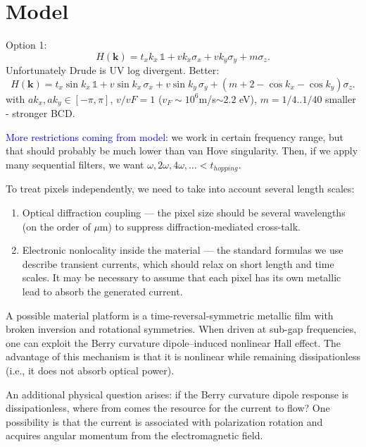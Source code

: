 \documentclass[aps, prb, superscriptaddress, longbibliography]{revtex4-2}
\newcommand{\addDO}[1]{\textcolor{blue}{#1}}
\numberwithin{equation}{section}
\begin{document}
\section{Model}
Option 1:
\begin{equation}
H(\mathbf{k})
=
t_x k_x\,\mathbb{1}
+
v k_x \sigma_x
+
v k_y \sigma_y
+
m \sigma_z .
\end{equation}
Unfortunately Drude is UV log divergent. Better:
\begin{equation}
H(\mathbf{k})
=
t_x \sin k_x\,\mathbb{1}
+
v \sin k_x\,\sigma_x
+
v \sin k_y\,\sigma_y
+
\left(m
+
2-\cos k_x-\cos k_y
\right)\sigma_z .
\end{equation}
with $a k_x,a k_y \in [-\pi, \pi]$, $v/vF =1$ ($v_F\sim 10^6$m/s$\sim 2.2$ eV), $m=1/4..1/40$ smaller - stronger BCD. 

\addDO{More restrictions coming from model:} we work in certain frequency range, but that should probably be much lower than van Hove singularity. Then, if we apply many sequential filters, we want $\omega,2\omega,4\omega,\dots < t_{hopping}$.

\newpage

To treat pixels independently, we need to take into account several length scales:
\begin{enumerate}
    \item Optical diffraction coupling — the pixel size should be several wavelengths (on the order of $\mu$m) to suppress diffraction-mediated cross-talk.
    \item Electronic nonlocality inside the material — the standard formulas we use describe transient currents, which should relax on short length and time scales. It may be necessary to assume that each pixel has its own metallic lead to absorb the generated current.
\end{enumerate}

A possible material platform is a time-reversal-symmetric metallic film with broken inversion and rotational symmetries. When driven at sub-gap frequencies, one can exploit the Berry curvature dipole–induced nonlinear Hall effect. The advantage of this mechanism is that it is nonlinear while remaining dissipationless (i.e., it does not absorb optical power).

An additional physical question arises: if the Berry curvature dipole response is dissipationless, where from comes the resource for the current to flow? One possibility is that the current is associated with polarization rotation and acquires angular momentum from the electromagnetic field.
\end{document}
